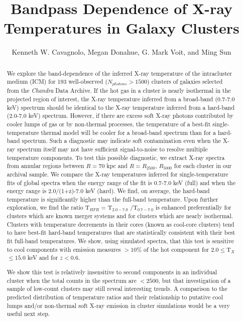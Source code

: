 \documentclass{emulateapj}
\newcommand{\tf}{T$_{HFR}$ }
\newcommand{\hard}{T$_{2.0-7.0}$ }
\newcommand{\full}{T$_{0.7-7.0}$ }
\newcommand{\tx}{T$_{X}$}
\newcommand{\chan}{{\textit{Chandra }}}
\begin{document}
\title{Bandpass Dependence of X-ray Temperatures in Galaxy Clusters}
\author{Kenneth W. Cavagnolo, Megan
Donahue, G. Mark Voit, and Ming
Sun}


\begin{abstract}

We explore the band-dependence of the inferred X-ray temperature of
the intracluster medium (ICM) for 193 well-observed ($N_{photons} >
1500$) clusters of galaxies selected from the \chan Data Archive. If
the hot gas in a cluster is nearly isothermal in the projected region
of interest, the  X-ray temperature inferred from a broad-band
(0.7-7.0 keV) spectrum should be identical to the X-ray temperature
inferred from a hard-band (2.0-7.0 keV) spectrum. However,  if there are
excess soft X-ray photons contributed by cooler lumps of gas or by
non-thermal processes, the temperature of a best-fit 
single-temperature thermal model will be cooler for a broad-band
spectrum than for a hard-band spectrum. Such a diagnostic may
indicate soft contamination even when the X-ray spectrum itself may
not have sufficient signal-to-noise to resolve multiple temperature
components. To test this possible diagnostic, we extract X-ray spectra
from annular regions between $R=70$ kpc and $R=R_{2500}$, $R_{5000}$ for
each cluster in our archival sample. We compare the X-ray temperatures
inferred for single-temperature fits of global spectra when the energy
range of the fit is 0.7-7.0 keV (full) and when the energy range is
2.0/(1+z)-7.0 keV (hard). We find, on average, the hard-band
temperature is significantly higher than the full-band 
temperature. Upon further exploration, we find the ratio
\tf = \hard/\full is enhanced preferentially for clusters which are
known merger systems and for clusters which are nearly isothermal. Clusters
with temperature decrements in their cores (known as cool-core
clusters) tend to have best-fit hard-band temperatures that are
statistically consistent with their best fit full-band
temperatures. We show, using simulated spectra, that this test is
sensitive to cool components with emission measures $> 10\%$ of the
hot component for $2.0 \leq $\tx$ \leq 15.0$ keV and for $z < 0.6$.

We show this test is relatively insensitive to second components
in an individual cluster when the total counts in the spectrum are $<
2500$, but that investigation of a sample of low-count clusters may
still reveal interesting trends. A comparison to the predicted
distribution of temperature ratios and their relationship to putative
cool lumps and/or non-thermal soft X-ray emission in cluster
simulations would be a very useful next step.
\end{abstract}
\end{document}
